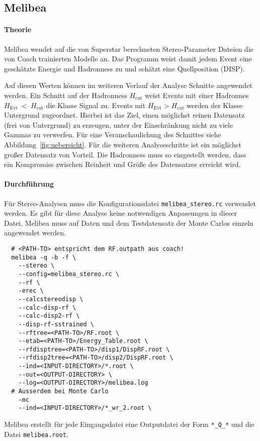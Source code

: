 \subsection{Melibea}%
\label{sub:melibea}

\paragraph{Theorie}

Melibea wendet auf die von Superstar berechneten
Stereo-Parameter Dateien
die von Coach trainierten Modelle an.
Das Programm weist damit jedem Event
eine geschätzte Energie und Hadronness zu
und schätzt eine Quellposition (DISP).

Auf diesen Werten können im weiteren Verlauf der Analyse
Schnitte angewendet werden.
Ein Schnitt auf der Hadronness $H_{\text{cut}}$
weist Events mit einer Hadronnes $H_{\text{Evt}}~<~H_{\text{cut}}$
die Klasse Signal zu.
Events mit $H_{\text{Evt}} > H_{\text{cut}}$ werden der Klasse Untergrund
zugeordnet.
Hierbei ist das Ziel, einen möglichst reinen
Datensatz (frei von Untergrund) zu erzeugen, 
unter der Einschränkung nicht zu viele Gammas zu verwerfen.
Für eine Veranschaulichung des Schnittes siehe Abbildung~\ref{fig:uebersicht}.
Für die weiteren Analyseschritte ist ein möglichst
großer Datensatz von Vorteil.
Die Hadronness muss so eingestellt werden,
dass ein Kompromiss zwischen Reinheit und Größe des Datensatzes erreicht wird.


\paragraph{Durchführung}%

Für Stereo-Analysen muss die Konfigurationsdatei \texttt{melibea\_stereo.rc}
verwendet werden.
Es gibt für diese Analyse keine notwendigen Anpassungen in dieser Datei.
Melibea muss auf Daten und dem Testdatensatz der Monte Carlos einzeln angewendet werden.

\begin{lstlisting}
  # <PATH-TO> entspricht dem RF.outpath aus coach!
  melibea -q -b -f \
    --stereo \
    --config=melibea_stereo.rc \
    --rf \
    -erec \
    --calcstereodisp \
    --calc-disp-rf \
    --calc-disp2-rf \
    --disp-rf-sstrained \
    --rftree=<PATH-TO>/RF.root \
    --etab=<PATH-TO>/Energy_Table.root \
    --rfdisptree=<PATH-TO>/disp1/DispRF.root \
    --rfdisp2tree=<PATH-TO>/disp2/DispRF.root \
    --ind=<INPUT-DIRECTORY>/*.root \
    --out=<OUTPUT-DIRECTORY> \
    --log=<OUTPUT-DIRECTORY>/melibea.log
  # Ausserdem bei Monte Carlo
    -mc 
    --ind=<INPUT-DIRECTORY>/*_wr_2.root \
\end{lstlisting}

Melibea erstellt für jede Eingangsdatei eine Outputdatei der
Form \texttt{*\_Q\_*} und die Datei \texttt{melibea.root}. 
